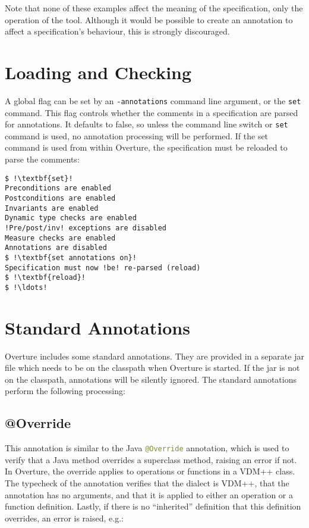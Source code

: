 Note that none of these examples affect the meaning of the
specification, only the operation of the tool. Although it would be
possible to create an annotation to affect a specification's
behaviour, this is strongly discouraged.

\section{Loading and Checking}

A global flag can be set by an \texttt{-annotations} command line
argument, or the \texttt{set} command. This flag controls whether the
comments in a specification are parsed for annotations. It defaults to
false, so unless the command line switch or \texttt{set} command is
used, no annotation processing will be performed. If the set command
is used from within Overture, the specification must be reloaded to
parse the comments:

\begin{lstlisting}[style=tool,escapechar=!]
$ !\textbf{set}!
Preconditions are enabled
Postconditions are enabled
Invariants are enabled
Dynamic type checks are enabled
!Pre/post/inv! exceptions are disabled
Measure checks are enabled
Annotations are disabled
$ !\textbf{set annotations on}!
Specification must now !be! re-parsed (reload)
$ !\textbf{reload}!
$ !\ldots!
\end{lstlisting}


\section{Standard Annotations}

Overture includes some standard annotations. They are provided in a
separate jar file which needs to be on the classpath when Overture is
started. If the jar is not on the classpath, annotations will be
silently ignored. The standard annotations perform the following
processing:

\subsection{@Override}

This annotation is similar to the Java
\lstinline[language=Java]|@Override| annotation, which is used to
verify that a Java method overrides a superclass method, raising an
error if not. In Overture, the override applies to operations or
functions in a VDM++ class. The typecheck of the annotation verifies
that the dialect is VDM++, that the annotation has no arguments, and
that it is applied to either an operation or a function
definition. Lastly, if there is no ``inherited'' definition that this
definition overrides, an error is
raised, e.g.:\\

